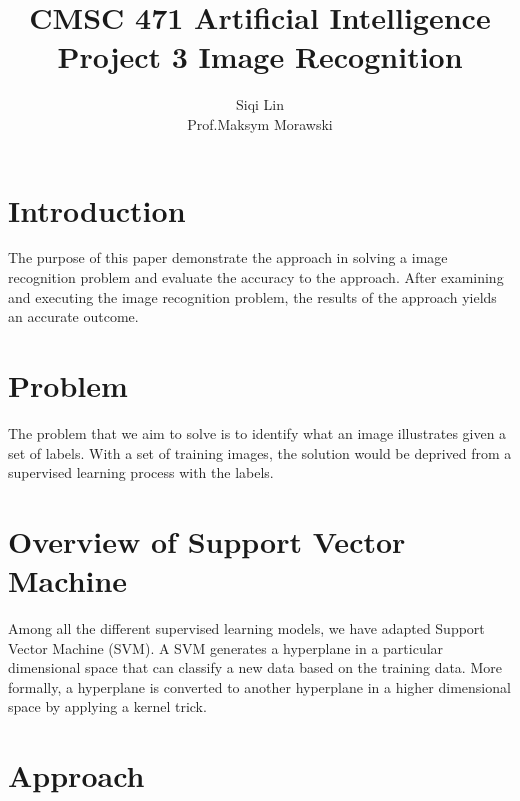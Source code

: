 \documentclass[a4paper]{article}
\title{CMSC 471 Artificial Intelligence\\
	Project 3 Image Recognition}
\author{Siqi Lin\\
	Prof.Maksym Morawski}
\begin{document}
\maketitle

\section{Introduction}
The purpose of this paper demonstrate the approach in solving a image recognition problem and evaluate the accuracy to the approach. After examining and executing the image recognition problem, the results of the approach yields an accurate outcome.

\section{Problem}
The problem that we aim to solve is to identify what an image illustrates given a set of labels. With a set of training images, the solution would be deprived from a supervised learning process with the labels. 
\section{Overview of Support Vector Machine}
 
Among all the different supervised learning models, we have adapted Support Vector Machine (SVM). A SVM generates a hyperplane in a particular dimensional space that can classify a new data based on the training data. More formally, a hyperplane is converted to another hyperplane in a higher dimensional space by applying a kernel trick. 

\section{Approach}
\end{document}
